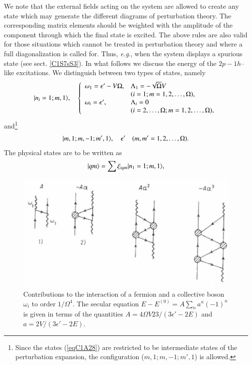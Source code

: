 We note that the external fields acting on the system are allowed to create
any state which may generate the different diagrams of perturbation theory.
The corresponding matrix elements should be weighted with the amplitude of
the component through which the final state is excited.
The above rules are also valid for those situations which cannot be treated
in perturbation theory and where a full diagonalization is called for. Thus,
\textit{e.g}., when the system displays a spurious state (see sect. \ref{C1S7sS3}).
In what follows we discuss the energy of the $2p-1h$--like excitations. We
distinguish between two types of states, namely
 \begin{align}\label{eqC1A27} 
|{n_i=1;m,1} \rangle,\quad\left\{
\begin{array}{ll}
\omega_1=\epsilon'-V\Omega, &\Lambda_1=-\sqrt{\Omega}V\\
&(i=1;m=1,2,\dots,\Omega),  \\ 
\omega_i=\epsilon', &\Lambda_i=0\\
&(i=2,\dots,\Omega; m=1,2,\dots,\Omega),
\end{array} \right. 
 \end{align}
and\footnote{Since the states (\ref{eqC1A28}) are restricted to be intermediate states of the perturbation
expansion, the configuration ($m,1;m,-1;m',1$) is allowed.}
 \begin{align}\label{eqC1A28} 
|{m,1;m,-1;m',1} \rangle,\quad\epsilon'\quad(m,m'=1,2,\dots,\Omega).
 \end{align}
The physical states are to be written as
 \begin{align}\label{eqC1A29} 
|{qm} \rangle=\sum\xi_{iqm}|{n_1=1;m,1} \rangle,
 \end{align}
  \begin{figure}
  \centerline {
  \includegraphics*[width=12cm]{introduccion/figs/fig19}
  }
  \caption{Contributions to the interaction of a fermion and a collective boson $\omega_i$ to order $1/\Omega^4$. The secular equation $E-E^{(0)}=A\sum_na^n(-1)^n$ is given in terms of the quantities $A=4\Omega V23/(3\epsilon'-2E)$ and $a=2V/(3\epsilon'-2E)$. }
  \label{figC1A2}
  \end{figure}
